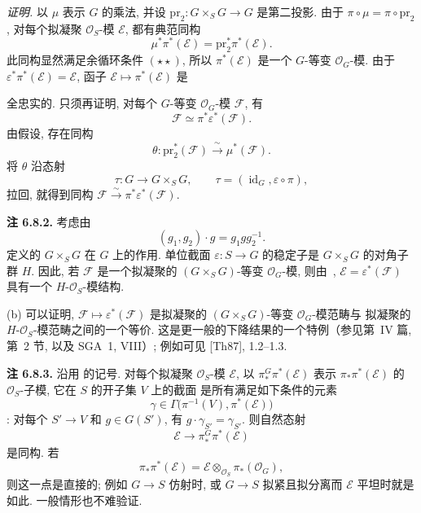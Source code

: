 \textit{证明.}
以 \(\mu\) 表示 \(G\) 的乘法, 并设
\(\mathrm{pr}_2:G\times_SG\to G\) 是第二投影.
由于 \(\pi\circ\mu=\pi\circ\mathrm{pr}_2\), 对每个拟凝聚
\(\mathcal O_S\)-模 \(\mathcal E\), 都有典范同构
\[
  \mu^*\pi^*(\mathcal E)
  =\mathrm{pr}_2^*\pi^*(\mathcal E).
\]
此同构显然满足余循环条件
 \((\star\star)\),
所以 \(\pi^*(\mathcal E)\) 是一个 \(G\)-等变 \(\mathcal O_G\)-模.
由于 \(\varepsilon^*\pi^*(\mathcal E)=\mathcal E\),
函子 \(\mathcal E\mapsto\pi^*(\mathcal E)\) 是

全忠实的. 只须再证明, 对每个 \(G\)-等变 \(\mathcal O_G\)-模
\(\mathcal F\), 有
\[
  \mathcal F\simeq\pi^*\varepsilon^*(\mathcal F).
\]
由假设, 存在同构
\[
  \theta:\mathrm{pr}_2^*(\mathcal F)
  \xrightarrow{\ \sim\ }\mu^*(\mathcal F).
\]
将 \(\theta\) 沿态射
\[
  \tau:G\longrightarrow G\times_SG,
  \qquad
  \tau=(\operatorname{id}_G,\varepsilon\circ\pi),
\]
拉回, 就得到同构
\(\mathcal F\xrightarrow{\sim}\pi^*\varepsilon^*(\mathcal F)\).

\medskip
\noindent{}\textbf{注 6.8.2.}
 考虑由
\[
  (g_1,g_2)\cdot g=g_1gg_2^{-1}.
\]
定义的 \(G\times_SG\) 在 \(G\) 上的作用.
单位截面 \(\varepsilon:S\to G\) 的稳定子是
\(G\times_SG\) 的对角子群 \(H\).
因此, 若 \(\mathcal F\) 是一个拟凝聚的
\((G\times_SG)\)-等变 \(\mathcal O_G\)-模,
则由~,
\(\mathcal E=\varepsilon^*(\mathcal F)\) 具有一个
\(H\)-\(\mathcal O_S\)-模结构.

(b) 可以证明, \(\mathcal F\mapsto\varepsilon^*(\mathcal F)\)
是拟凝聚的 \((G\times_SG)\)-等变 \(\mathcal O_G\)-模范畴与
拟凝聚的 \(H\)-\(\mathcal O_S\)-模范畴之间的一个等价.
这是更一般的下降结果的一个特例（参见第~IV 篇, 第~2 节, 以及 SGA~1, VIII）;
例如可见 [Th87], 1.2--1.3.

\medskip
\noindent{}\textbf{注 6.8.3.}
沿用  的记号.
对每个拟凝聚 \(\mathcal O_S\)-模 \(\mathcal E\),
以 \(\pi_*^G\pi^*(\mathcal E)\) 表示 \(\pi_*\pi^*(\mathcal E)\)
的 \(\mathcal O_S\)-子模, 它在 \(S\) 的开子集 \(V\) 上的截面
是所有满足如下条件的元素
\[
  \gamma\in\Gamma\bigl(\pi^{-1}(V),\pi^*(\mathcal E)\bigr)
\]
: 对每个 \(S'\to V\) 和 \(g\in G(S')\), 有
\(g\cdot\gamma_{S'}=\gamma_{S'}\). 则自然态射
\[
  \mathcal E\longrightarrow\pi_*^G\pi^*(\mathcal E)
\]
是同构. 若
\[
  \pi_*\pi^*(\mathcal E)
  =\mathcal E\otimes_{\mathcal O_S}\pi_*(\mathcal O_G),
\]
则这一点是直接的; 例如 \(G\to S\) 仿射时, 或 \(G\to S\)
拟紧且拟分离而 \(\mathcal E\) 平坦时就是如此.
一般情形也不难验证.


